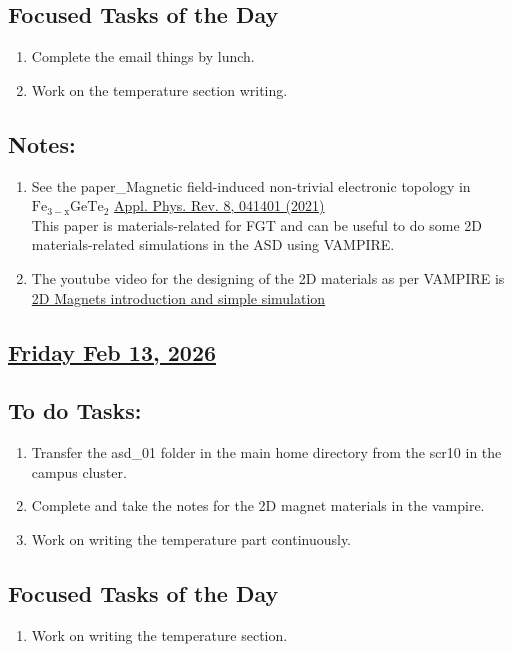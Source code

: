 \subsection*{Focused Tasks of the Day}
\begin{enumerate}[\ding{212}]  %
    \item Complete the email things by lunch. \cmark
    \item Work on the temperature section writing. \cmark [\textcolor{red}{2 paragraph only in Docx file.}]  
\end{enumerate}
\subsection*{Notes:}
\begin{enumerate}
    \item See the paper\_Magnetic field-induced non-trivial electronic topology in $\mathrm{Fe_{3-x}Ge Te_2}$ \href{https://doi.org/10.1063/5.0052952}{Appl. Phys. Rev. 8, 041401 (2021)}\\  This paper is materials-related for FGT and can be useful to do some 2D materials-related simulations in the ASD using VAMPIRE.
    \item The youtube video for the designing of the 2D materials as per VAMPIRE is \\ \href{https://youtu.be/rcSEvs9BI4A}{2D Magnets introduction and simple simulation}
\end{enumerate}
\subsection*{\underline{Friday Feb 13, 2026}}
\subsection*{To do Tasks:}
\begin{enumerate}
    \item Transfer the asd\_01 folder in the main home directory from the scr10 in the campus cluster. \cmark
    \item Complete and take the notes for the 2D magnet materials in the vampire.
    \item Work on writing the temperature part continuously. \cmark 
\end{enumerate}
\subsection*{Focused Tasks of the Day}
\begin{enumerate}[\ding{52}]  %
    \item Work on writing the temperature section. \cmark
\end{enumerate}
